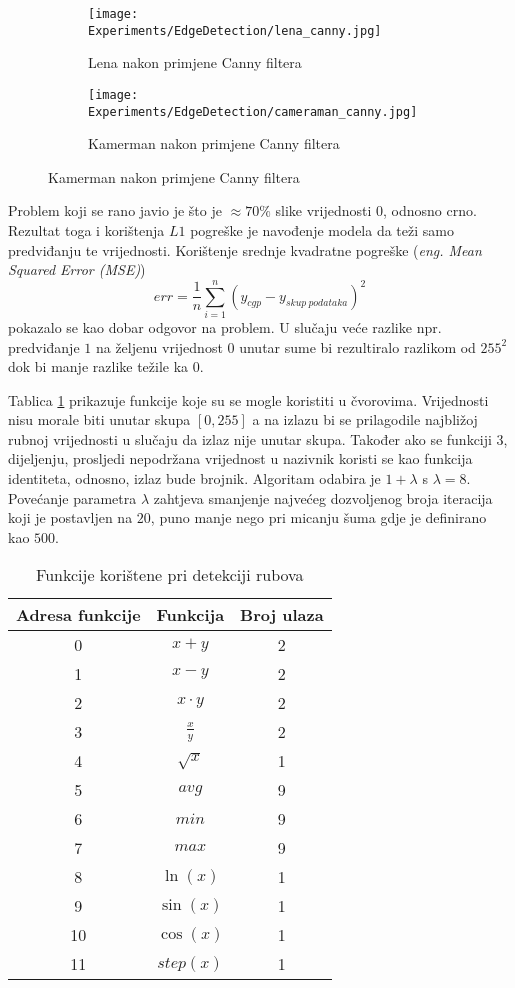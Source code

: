 \begin{figure}
	\centering
	\caption{Fotografije Lene i Kamermana nakon primjene detekcije ruba \emph{Canny} algoritmom}
	\begin{subfigure}[t]{0.45\textwidth}
		\texttt{[image: Experiments/EdgeDetection/lena\_canny.jpg]}
		\caption{Lena nakon primjene Canny filtera}
		\label{fig:lena_canny}
	\end{subfigure}
	\begin{subfigure}[t]{0.45\textwidth}
		\texttt{[image: Experiments/EdgeDetection/cameraman\_canny.jpg]}
		\caption{Kamerman nakon primjene Canny filtera}
		\label{fig:camerman_canny}
	\end{subfigure}
	\label{fig:edge_detection_train_val_in}
\end{figure}

Problem koji se rano javio je što je $\approx 70\%$ slike vrijednosti $0$, odnosno crno.
Rezultat toga i korištenja $L1$ pogreške je navođenje modela da teži samo predviđanju te vrijednosti.
Korištenje srednje kvadratne pogreške (\emph{eng. Mean Squared Error (MSE)})
$$err = \frac{1}{n}\sum_{i=1}^{n}(y_{cgp} - y_{skup\ podataka})^2$$
pokazalo se kao dobar odgovor na problem.
U slučaju veće razlike npr. predviđanje $1$ na željenu vrijednost $0$ unutar sume bi rezultiralo razlikom od $255^2$ dok bi manje razlike težile ka $0$.

Tablica \ref{table:edge_detection_function_set} prikazuje funkcije koje su se mogle koristiti u čvorovima.
Vrijednosti nisu morale biti unutar skupa $[0, 255]$ a na izlazu bi se prilagodile najbližoj rubnoj vrijednosti u slučaju da izlaz nije unutar skupa.
Također ako se funkciji $3$, dijeljenju, prosljedi nepodržana vrijednost u nazivnik koristi se kao funkcija identiteta, odnosno, izlaz bude brojnik.
Algoritam odabira je $1 + \lambda$ s $\lambda = 8$.
Povećanje parametra $\lambda$ zahtjeva smanjenje najvećeg dozvoljenog broja iteracija koji je postavljen na $20$, puno manje nego pri micanju šuma gdje je definirano kao $500$.

\begin{table}
	\centering
	\begin{tabular}{||c c c||}
		\hline
		Adresa funkcije & Funkcija & Broj ulaza \\ [0.5ex]
		\hline \hline
		0 & $x + y$ & 2 \\
		1 & $x - y$ & 2 \\
		2 & $x \cdot y$ & 2 \\
		3 & $\frac{x}{y}$ & 2 \\
		4 & $\sqrt{x}$ & 1 \\
		5 & $avg$ & 9 \\
		6 & $min$ & 9 \\
		7 & $max$ & 9 \\
		8 & $\ln(x)$ & 1 \\
		9 & $\sin(x)$ & 1 \\
		10 & $\cos(x)$ & 1 \\
		11 & $step(x)$ & 1 \\ [1ex]
		\hline
	\end{tabular}
	\caption{Funkcije korištene pri detekciji rubova}
	\label{table:edge_detection_function_set}
\end{table}

